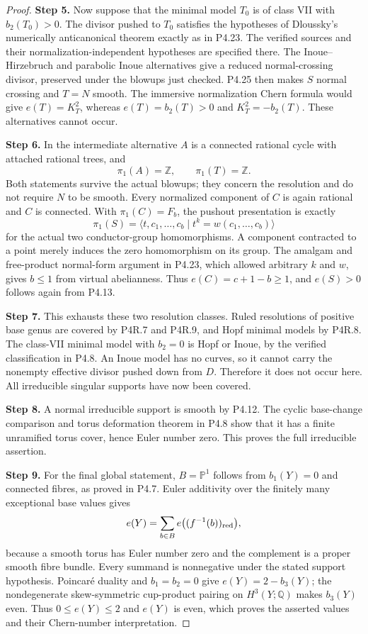 \begin{proof}
\noindent\textbf{Step 5.} Now suppose that the minimal model
$T_0$ is of class VII with
$b_2(T_0)>0$. The divisor pushed to
$T_0$ satisfies the hypotheses of
Dloussky's numerically anticanonical
theorem exactly as in P4.23.
The verified sources and their
normalization-independent hypotheses
are specified there. The
Inoue--Hirzebruch and parabolic Inoue
alternatives give a reduced
normal-crossing divisor, preserved
under the blowups just checked.
P4.25 then makes $S$ normal crossing
and $T=N$ smooth. The immersive
normalization Chern formula would
give $e(T)=K_T^2$, whereas
$e(T)=b_2(T)>0$ and
$K_T^2=-b_2(T)$. These alternatives
cannot occur.

\noindent\textbf{Step 6.} In the intermediate alternative
$A$ is a connected rational cycle
with attached rational trees, and
\[
 \pi_1(A)=\mathbb Z,\qquad
 \pi_1(T)=\mathbb Z.
\]
Both statements survive the actual
blowups; they concern the resolution
and do not require $N$ to be smooth.
Every normalized component of $C$
is again rational and $C$ is connected.
With $\pi_1(C)=F_b$, the pushout
presentation is exactly
\[
 \pi_1(S)=
 \langle t,c_1,\ldots,c_b
 \mid t^k=w(c_1,\ldots,c_b)\rangle
\]
for the actual two conductor-group
homomorphisms. A component contracted
to a point merely induces the zero
homomorphism on its group. The
amalgam and free-product normal-form
argument in P4.23, which allowed
arbitrary $k$ and $w$, gives $b\le1$
from virtual abelianness.
Thus $e(C)=c+1-b\ge1$, and
$e(S)>0$ follows again from P4.13.

\noindent\textbf{Step 7.} This exhausts these two resolution
classes. Ruled resolutions of positive
base genus are covered by P4R.7
and P4R.9, and Hopf minimal models
by P4R.8. The class-VII minimal
model with $b_2=0$ is Hopf or Inoue,
by the verified classification in
P4.8. An Inoue model has no curves,
so it cannot carry the nonempty
effective divisor pushed down from
$D$. Therefore it does not occur
here. All irreducible singular
supports have now been covered.

\noindent\textbf{Step 8.} A normal irreducible support is
smooth by P4.12. The cyclic
base-change comparison and torus
deformation theorem in P4.8 show
that it has a finite unramified
torus cover, hence Euler number
zero. This proves the full
irreducible assertion.

\noindent\textbf{Step 9.} For the final global statement,
$B=\mathbb P^1$ follows from
$b_1(Y)=0$ and connected fibres,
as proved in P4.7. Euler
additivity over the finitely many
exceptional base values gives
\[
 e(Y)=\sum_{b\in B}
 e\bigl((f^{-1}(b))_{\rm red}\bigr),
\]
because a smooth torus has Euler
number zero and the complement
is a proper smooth fibre bundle.
Every summand is nonnegative
under the stated support
hypothesis. Poincar\'e duality
and $b_1=b_2=0$ give
$e(Y)=2-b_3(Y)$; the nondegenerate
skew-symmetric cup-product
pairing on $H^3(Y;\mathbb Q)$
makes $b_3(Y)$ even. Thus
$0\le e(Y)\le2$ and $e(Y)$ is
even, which proves the asserted
values and their Chern-number
interpretation.
\end{proof}


